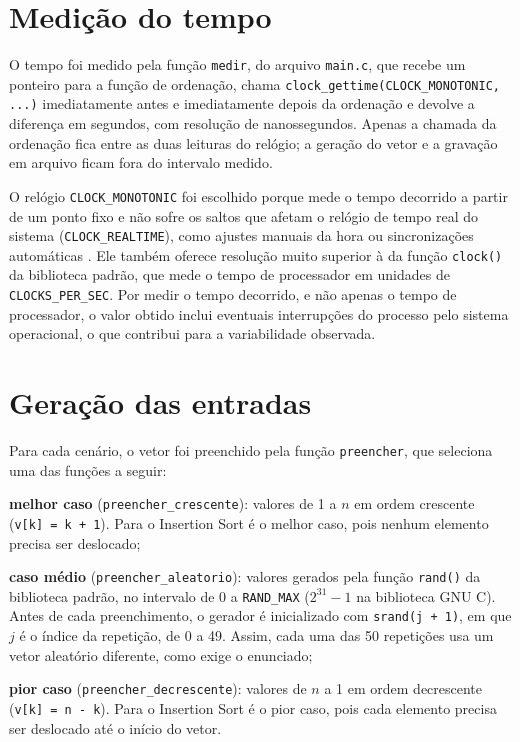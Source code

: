 \documentclass[
    12pt,
    oneside,
    a4paper,
    openany,
    chapter=TITLE,
    english,
    brazil
]{abntex2}
\begin{document}
\section{Medição do tempo}

O tempo foi medido pela função \texttt{medir}, do arquivo \texttt{main.c}, que recebe um ponteiro para a função de ordenação, chama \texttt{clock\_gettime(CLOCK\_MONOTONIC, ...)} imediatamente antes e imediatamente depois da ordenação e devolve a diferença em segundos, com resolução de nanossegundos. Apenas a chamada da ordenação fica entre as duas leituras do relógio; a geração do vetor e a gravação em arquivo ficam fora do intervalo medido.

O relógio \texttt{CLOCK\_MONOTONIC} foi escolhido porque mede o tempo decorrido a partir de um ponto fixo e não sofre os saltos que afetam o relógio de tempo real do sistema (\texttt{CLOCK\_REALTIME}), como ajustes manuais da hora ou sincronizações automáticas \cite{manclock}. Ele também oferece resolução muito superior à da função \texttt{clock()} da biblioteca padrão, que mede o tempo de processador em unidades de \texttt{CLOCKS\_PER\_SEC}. Por medir o tempo decorrido, e não apenas o tempo de processador, o valor obtido inclui eventuais interrupções do processo pelo sistema operacional, o que contribui para a variabilidade observada.

\section{Geração das entradas}
\label{sec:entradas}

Para cada cenário, o vetor foi preenchido pela função \texttt{preencher}, que seleciona uma das funções a seguir:

\begin{alineas}
    \item \textbf{melhor caso} (\texttt{preencher\_crescente}): valores de 1 a $n$ em ordem crescente (\texttt{v[k] = k + 1}). Para o Insertion Sort é o melhor caso, pois nenhum elemento precisa ser deslocado;
    \item \textbf{caso médio} (\texttt{preencher\_aleatorio}): valores gerados pela função \texttt{rand()} da biblioteca padrão, no intervalo de 0 a \texttt{RAND\_MAX} ($2^{31} - 1$ na biblioteca GNU C). Antes de cada preenchimento, o gerador é inicializado com \texttt{srand(j + 1)}, em que $j$ é o índice da repetição, de 0 a 49. Assim, cada uma das 50 repetições usa um vetor aleatório diferente, como exige o enunciado;
    \item \textbf{pior caso} (\texttt{preencher\_decrescente}): valores de $n$ a 1 em ordem decrescente (\texttt{v[k] = n - k}). Para o Insertion Sort é o pior caso, pois cada elemento precisa ser deslocado até o início do vetor.
\end{alineas}
\end{document}
